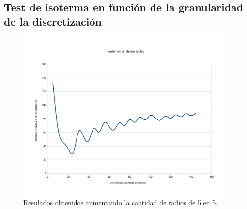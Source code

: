 \subsection{Test de isoterma en función de la granularidad de la discretización}

\begin{figure}[H]{}
\centering
\includegraphics[scale=0.5]{graphs/IsotermaVsGranularidad.pdf}
\caption{Resulados obtenidos aumentando la cantidad de radios de 5 en 5.}
\label{isotermaVsGranularidad}
\end{figure}